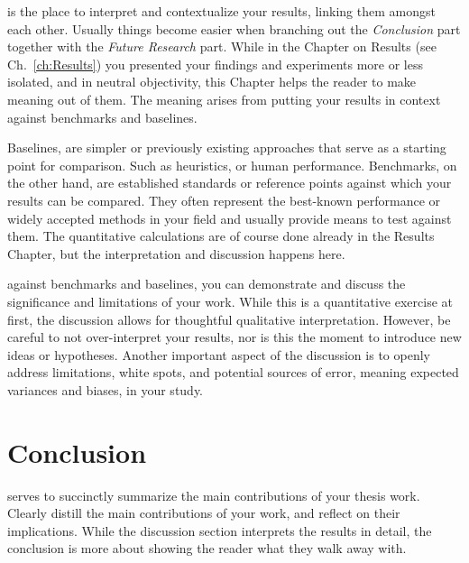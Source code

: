  is the place to interpret and contextualize your results, linking them amongst each other. 
Usually things become easier when branching out the \textit{Conclusion} part together with the \textit{Future Research} part. 
While in the Chapter on Results (see Ch.~\ref{ch:Results}) you presented your findings and experiments more or less isolated, and in neutral objectivity, 
this Chapter helps the reader to make meaning out of them. The meaning arises from putting your results in context against benchmarks and baselines. 

Baselines, are simpler or previously existing approaches that serve as a starting point for comparison. Such as heuristics, or human performance. 
Benchmarks, on the other hand, are established standards or reference points against which your results can be compared. 
They often represent the best-known performance or widely accepted methods in your field and usually provide means to test against them. The quantitative
calculations are of course done already in the Results Chapter, but the interpretation and discussion happens here.



 against benchmarks and baselines, you can demonstrate and discuss the significance and limitations of your work.
While this is a quantitative exercise at first, the discussion allows for thoughtful qualitative interpretation. 
However, be careful to not over-interpret your results, nor is this the moment to introduce new ideas or hypotheses. 
Another important aspect of the discussion is to openly 
address limitations, white spots, and potential sources of error, meaning expected variances and biases, in your study. 







\bigskip
\section{Conclusion}\label{sec:Conclusion}
 serves to succinctly summarize the main contributions of your thesis work.
Clearly distill the main contributions of your work, and reflect on their implications. 
While the discussion section interprets the results in detail, the conclusion is more about showing the reader what they walk away with.


